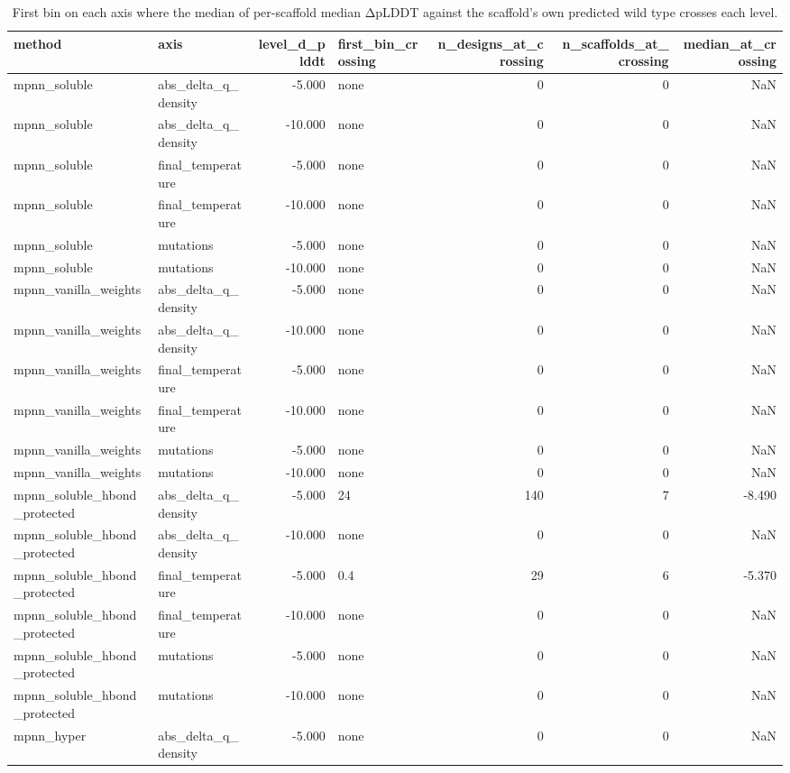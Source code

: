 \begin{table}
\caption{First bin on each axis where the median of per-scaffold median ΔpLDDT against the scaffold's own predicted wild type crosses each level.}
\label{tab:T7b_plddt_first_crossing}
\begin{tabular}{llrlrrr}
\toprule
method & axis & level\_d\_plddt & first\_bin\_crossing & n\_designs\_at\_crossing & n\_scaffolds\_at\_crossing & median\_at\_crossing \\
\midrule
mpnn\_soluble & abs\_delta\_q\_density & -5.000 & none & 0 & 0 & NaN \\
mpnn\_soluble & abs\_delta\_q\_density & -10.000 & none & 0 & 0 & NaN \\
mpnn\_soluble & final\_temperature & -5.000 & none & 0 & 0 & NaN \\
mpnn\_soluble & final\_temperature & -10.000 & none & 0 & 0 & NaN \\
mpnn\_soluble & mutations & -5.000 & none & 0 & 0 & NaN \\
mpnn\_soluble & mutations & -10.000 & none & 0 & 0 & NaN \\
mpnn\_vanilla\_weights & abs\_delta\_q\_density & -5.000 & none & 0 & 0 & NaN \\
mpnn\_vanilla\_weights & abs\_delta\_q\_density & -10.000 & none & 0 & 0 & NaN \\
mpnn\_vanilla\_weights & final\_temperature & -5.000 & none & 0 & 0 & NaN \\
mpnn\_vanilla\_weights & final\_temperature & -10.000 & none & 0 & 0 & NaN \\
mpnn\_vanilla\_weights & mutations & -5.000 & none & 0 & 0 & NaN \\
mpnn\_vanilla\_weights & mutations & -10.000 & none & 0 & 0 & NaN \\
mpnn\_soluble\_hbond\_protected & abs\_delta\_q\_density & -5.000 & 24 & 140 & 7 & -8.490 \\
mpnn\_soluble\_hbond\_protected & abs\_delta\_q\_density & -10.000 & none & 0 & 0 & NaN \\
mpnn\_soluble\_hbond\_protected & final\_temperature & -5.000 & 0.4 & 29 & 6 & -5.370 \\
mpnn\_soluble\_hbond\_protected & final\_temperature & -10.000 & none & 0 & 0 & NaN \\
mpnn\_soluble\_hbond\_protected & mutations & -5.000 & none & 0 & 0 & NaN \\
mpnn\_soluble\_hbond\_protected & mutations & -10.000 & none & 0 & 0 & NaN \\
mpnn\_hyper & abs\_delta\_q\_density & -5.000 & none & 0 & 0 & NaN \\

\end{tabular}
\end{table}
